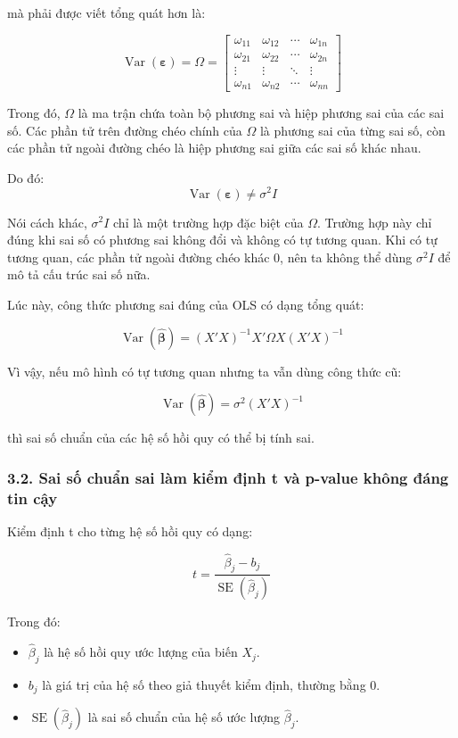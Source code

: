 mà phải được viết tổng quát hơn là:

\[
\operatorname{Var}(\boldsymbol{\varepsilon})
=
\Omega
=
\begin{bmatrix}
\omega_{11} & \omega_{12} & \cdots & \omega_{1n} \\
\omega_{21} & \omega_{22} & \cdots & \omega_{2n} \\
\vdots & \vdots & \ddots & \vdots \\
\omega_{n1} & \omega_{n2} & \cdots & \omega_{nn}
\end{bmatrix}
\]

Trong đó, \(\Omega\) là ma trận chứa toàn bộ phương sai và hiệp phương sai của các sai số. Các phần tử trên đường chéo chính của \(\Omega\) là phương sai của từng sai số, còn các phần tử ngoài đường chéo là hiệp phương sai giữa các sai số khác nhau.

Do đó:
\[
\operatorname{Var}(\boldsymbol{\varepsilon}) \neq \sigma^2 I
\]

Nói cách khác, \(\sigma^2 I\) chỉ là một trường hợp đặc biệt của \(\Omega\). Trường hợp này chỉ đúng khi sai số có phương sai không đổi và không có tự tương quan. Khi có tự tương quan, các phần tử ngoài đường chéo khác 0, nên ta không thể dùng \(\sigma^2 I\) để mô tả cấu trúc sai số nữa.

Lúc này, công thức phương sai đúng của OLS có dạng tổng quát:

\[
\operatorname{Var}(\hat{\boldsymbol{\beta}})
=
(X'X)^{-1}X'\Omega X(X'X)^{-1}
\]

Vì vậy, nếu mô hình có tự tương quan nhưng ta vẫn dùng công thức cũ:

\[
\operatorname{Var}(\hat{\boldsymbol{\beta}})
=
\sigma^2(X'X)^{-1}
\]

thì sai số chuẩn của các hệ số hồi quy có thể bị tính sai.

\subsubsection{3.2. Sai số chuẩn sai làm kiểm định t và p-value không đáng tin cậy}

Kiểm định t cho từng hệ số hồi quy có dạng:

\[
t
=
\frac{\hat{\beta}_j-b_j}
{\operatorname{SE}(\hat{\beta}_j)}
\]

Trong đó:

\begin{itemize}
    \item $\hat{\beta}_j$ là hệ số hồi quy ước lượng của biến $X_j$.
    
    \item $b_j$ là giá trị của hệ số theo giả thuyết kiểm định, thường bằng 0.
    
    \item $\operatorname{SE}(\hat{\beta}_j)$ là sai số chuẩn của hệ số ước lượng $\hat{\beta}_j$.
\end{itemize}

